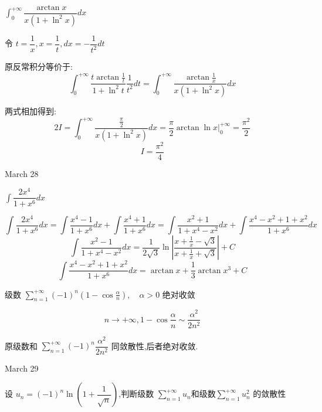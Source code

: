 \begin{example}[][Exam: 29.4.11]
	$\int_{0}^{+\infty}\dfrac{\arctan x}{x(1+\ln^2 x)}dx$
\end{example}

\begin{solution}
	
	令 $t=\dfrac{1}{x},x=\dfrac{1}{t},dx=-\dfrac{1}{t^2}dt$
	
	原反常积分等价于: 
	$$\int_{0}^{+\infty}\frac{t\arctan \frac{1}{t}}{1+\ln^2 t}\frac{1}{t^2}dt=\int_{0}^{+\infty}\frac{\arctan \frac{1}{x}}{x(1+\ln^2 x)}dx$$
	
	两式相加得到: 
	$$2I=\int_{0}^{+\infty}\frac{\frac{\pi}{2}}{x(1+\ln^2 x)}dx=\frac{\pi}{2}\arctan \ln x|_{0}^{+\infty}=\frac{\pi^2}{2}$$
	$$I=\frac{\pi^2}{4}$$
\end{solution}

\textcolor{purplea}{March 28}

\begin{example}[][Exam: 29.4.12]
	$\int\dfrac{2x^4}{1+x^6}dx$
\end{example}

\begin{solution}
	
	$$\int\frac{2x^4}{1+x^6}dx=\int\frac{x^4-1}{1+x^6}dx+\int\frac{x^4+1}{1+x^6}dx=\int\frac{x^2+1}{1+x^4-x^2}dx+\int\frac{x^4-x^2+1+x^2}{1+x^6}dx$$
	$$\int\frac{x^2-1}{1+x^4-x^2}dx=\frac{1}{2\sqrt{3}}\ln|\frac{x+\frac{1}{x}-\sqrt{3}}{x+\frac{1}{x}+\sqrt{3}}|+C$$
	$$\int\frac{x^4-x^2+1+x^2}{1+x^6}dx=\arctan x+\frac{1}{3}\arctan x^3+C$$
\end{solution}

\begin{example}[][Exam: 29.4.13]
	级数 $\sum\limits_{n=1}^{+\infty}(-1)^n(1-\cos \frac{\alpha}{n}),\quad \alpha >0$ 绝对收敛
\end{example}

\begin{solution}
	
	$$n\rightarrow +\infty,1-\cos \frac{\alpha}{n}\sim \frac{\alpha^2}{2n^2}$$
	
	原级数和 $\sum\limits_{n=1}^{+\infty}(-1)^n\dfrac{\alpha^2}{2n^2}$ 同敛散性,后者绝对收敛.
\end{solution}

\textcolor{purplea}{March 29}

\begin{example}[][Exam: 29.4.14]
	设 $u_{n}=(-1)^{n}\ln(1+\dfrac{1}{\sqrt{n}})$,判断级数 $\sum\limits_{n=1}^{+\infty}u_{n}$和级数$\sum\limits_{n=1}^{+\infty}u^{2}_{n}$ 的敛散性
\end{example}

